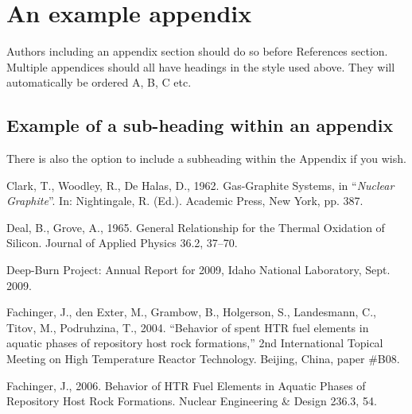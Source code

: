 \documentclass[5p,times,procedia]{elsarticle}
\begin{document}
\appendix
\section{An example appendix}
Authors including an appendix section should do so before References section. Multiple appendices should all have headings in the style used above. They will automatically be ordered A, B, C etc.

\subsection{Example of a sub-heading within an appendix}
There is also the option to include a subheading within the Appendix if you wish.


%
%




 \begin{thebibliography}{00}


Clark, T., Woodley, R., De Halas, D., 1962. Gas-Graphite Systems, in ``{\it Nuclear Graphite}''. 
In: Nightingale, R. (Ed.). Academic Press, New York, pp. 387.

Deal, B., Grove, A., 1965. General Relationship for the Thermal Oxidation of Silicon. Journal of Applied Physics 36.2, 37--70.

Deep-Burn Project: Annual Report for 2009, Idaho National Laboratory, Sept. 2009.

Fachinger, J., den Exter, M., Grambow, B., Holgerson, S., Landesmann, C., Titov, M., Podruhzina, T., 2004. ``Behavior of spent HTR fuel elements in aquatic phases of repository host rock formations,'' 2nd International Topical Meeting on High Temperature Reactor Technology. Beijing, China, paper \#B08. 

Fachinger, J., 2006. Behavior
of HTR Fuel Elements in Aquatic Phases of Repository Host Rock Formations. Nuclear Engineering \& Design 236.3,      54.

 \end{thebibliography}
\end{document}
